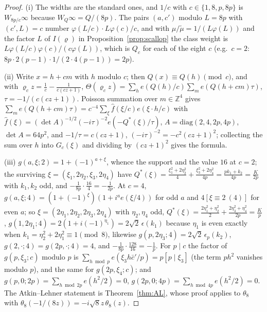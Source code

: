 \documentclass[11pt]{amsart}
\theoremstyle{remark}
\newcommand{\Z}{\mathbb{Z}}
\begin{document}
\begin{proof}
(i) The widths are the standard ones, and $1/c$ with $c\in\{1,8,p,8p\}$ is $W_{8p/c}\infty$ because $W_Q\infty=Q/(8p)$. The pairs $(a,c')$ modulo $L=8p$ with $(c',L)=c$ number $\varphi(L/c)\cdot L\varphi(c)/c$, and with $\mu/\tilde\mu=1/(L\varphi(L))$ and the factor $L$ of $I(\varrho)$ in Proposition~\ref{prop:scallop} the class weight is $L\varphi(L/c)\varphi(c)/(c\varphi(L))$, which is $Q_c$ for each of the eight $c$ (e.g.\ $c=2$: $8p\cdot2(p-1)\cdot1/(2\cdot4(p-1))=2p$).

(ii) Write $x=h+cm$ with $h$ modulo $c$; then $Q(x)\equiv Q(h)\pmod c$, and with $\varrho_cz=\frac1c-\frac1{c(cz+1)}$,
$\Theta(\varrho_cz)=\sum_he(Q(h)/c)\sum_me(Q(h+cm)\tau)$, $\tau=-1/(c(cz+1))$. Poisson summation over $m\in\Z^4$ gives $\sum_me(Q(h+cm)\tau)=c^{-4}\sum_\xi\hat f(\xi/c)e(\xi\cdot h/c)$ with $\hat f(\xi)=(\det A)^{-1/2}(-i\tau)^{-2}e(-Q^*(\xi)/\tau)$, $A=\mathrm{diag}(2,4,2p,4p)$, $\det A=64p^2$, and $-1/\tau=c(cz+1)$, $(-i\tau)^{-2}=-c^2(cz+1)^2$; collecting the sum over $h$ into $G_c(\xi)$ and dividing by $(cz+1)^2$ gives the formula.

(iii) $g(a,\xi;2)=1+(-1)^{a+\xi}$, whence the support and the value $16$ at $c=2$; the surviving $\xi=(\xi_1,2\eta_2,\xi_3,2\eta_4)$ have $Q^*(\xi)=\frac{\xi_1^2+2\eta_2^2}4+\frac{\xi_3^2+2\eta_4^2}{4p}=\frac{pk_1+k_2}{4p}=\frac K{2p}$ with $k_1,k_2$ odd, and $-\frac1{8p}\cdot\frac{16}4=-\frac1{2p}$. At $c=4$, $g(a,\xi;4)=(1+(-1)^\xi)(1+i^ae(\xi/4))$ for odd $a$ and $4[\xi\equiv2\ (4)]$ for even $a$; so $\xi=(2\eta_1,2\eta_2,2\eta_3,2\eta_4)$ with $\eta_2,\eta_4$ odd, $Q^*(\xi)=\frac{2\eta_1^2+\eta_2^2}2+\frac{2\eta_3^2+\eta_4^2}{2p}=\frac Kp$, $g(1,2\eta_1;4)=2(1+i(-1)^{\eta_1})=2\sqrt2\,\epsilon(k_1)$ because $\eta_1$ is even exactly when $k_1=\eta_2^2+2\eta_1^2\equiv1\pmod8$, likewise $g(p,2\eta_3;4)=2\sqrt2\,\epsilon_p(k_2)$, $g(2,\cdot;4)=g(2p,\cdot;4)=4$, and $-\frac1{8p}\cdot\frac{128}{16}=-\frac1p$. For $p\mid c$ the factor of $g(p,\xi_3;c)$ modulo $p$ is $\sum_{h\bmod p}e(\xi_3h\bar c'/p)=p[p\mid\xi_3]$ (the term $ph^2$ vanishes modulo $p$), and the same for $g(2p,\xi_4;c)$; and $g(p,0;2p)=\sum_{h\bmod2p}e(h^2/2)=0$, $g(2p,0;4p)=\sum_{h\bmod4p}e(h^2/2)=0$. The Atkin--Lehner statement is Theorem~\ref{thm:AL}, whose proof applies to $\theta_8$ with $\theta_8(-1/(8z))=-i\sqrt8z\,\theta_8(z)$.


\end{proof}
\end{document}
